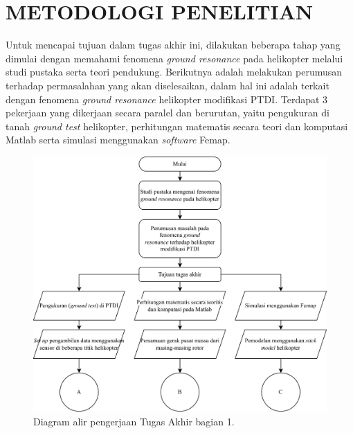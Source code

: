 \chapter{METODOLOGI PENELITIAN}
\label{chap:metodologipenelitian}


Untuk mencapai tujuan dalam tugas akhir ini, dilakukan beberapa tahap yang dimulai dengan memahami fenomena \textit{ground resonance} pada helikopter melalui studi pustaka serta teori pendukung. Berikutnya adalah melakukan perumusan terhadap permasalahan yang akan diselesaikan, dalam hal ini adalah terkait dengan fenomena \textit{ground resonance} helikopter modifikasi PTDI. Terdapat 3 pekerjaan yang dikerjaan secara paralel dan berurutan, yaitu pengukuran di tanah \textit{ground test} helikopter, perhitungan matematis secara teori dan komputasi Matlab serta simulasi menggunakan \textit{software} Femap. 

\begin{figure}[H]
	\centering
	\includegraphics[width=1\linewidth]{gambar/TA_flow-Page-1.jpg}
	\caption{Diagram alir pengerjaan Tugas Akhir bagian 1.}
	\label{fig:TA_flow-Page-1.jpg}
\end{figure}

